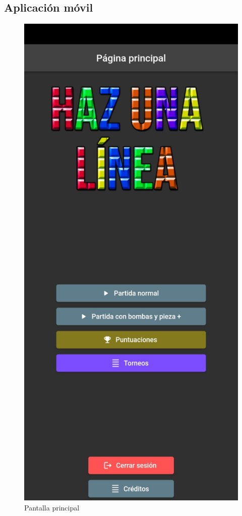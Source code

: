 \documentclass{article}
\begin{document}
\subsection{Aplicación móvil}
\begin{figure}[H]
  \includegraphics[width=\textwidth]{imagenes/inicio.jpeg}
  \caption{Pantalla principal} 
\end{figure} 
\end{document}

